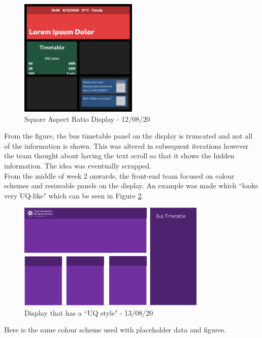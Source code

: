 \documentclass{article}
\begin{document}
		\begin{figure}[h!]
			\centering
			\includegraphics[width=0.5\textwidth]{Figures/prototype5.png}
			\caption{Square Aspect Ratio Display - 12/08/20}
			\label{proto5}
		\end{figure}
		From the figure, the bus timetable panel on the display is truncated and not all of the information is shown. This was altered in subsequent iterations however the team thought about having the text scroll so that it shows the hidden information. The idea was eventually scrapped. \\
		
		From the middle of week 2 onwards, the front-end team focused on colour schemes and resizeable panels on the display. An example was made which ``looks very UQ-like" which can be seen in Figure \ref{UQlike}. \\
		
		\begin{figure}[h!]
			\centering
			\includegraphics[width=0.8\textwidth]{Figures/UQlike.png}
			\caption{Display that has a ``UQ style" - 13/08/20}
			\label{UQlike}
		\end{figure}
		Here is the same colour scheme used with placeholder data and figures. \\
		
\end{document}
